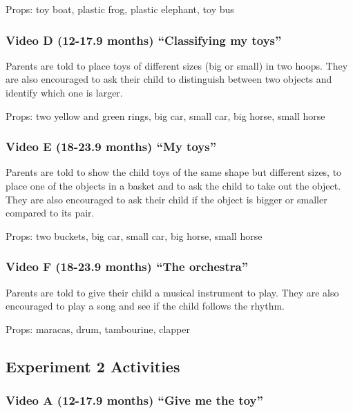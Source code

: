 \documentclass[man,floatsintext]{apa6}
\begin{document}
\begin{appendix}
Props: toy boat, plastic frog, plastic elephant, toy bus

\hypertarget{video-d-12-17.9-months-classifying-my-toys}{%
\subsubsection{Video D (12-17.9 months) ``Classifying my
toys''}\label{video-d-12-17.9-months-classifying-my-toys}}

Parents are told to place toys of different sizes (big or small) in two
hoops. They are also encouraged to ask their child to distinguish
between two objects and identify which one is larger.

Props: two yellow and green rings, big car, small car, big horse, small
horse

\hypertarget{video-e-18-23.9-months-my-toys}{%
\subsubsection{Video E (18-23.9 months) ``My
toys''}\label{video-e-18-23.9-months-my-toys}}

Parents are told to show the child toys of the same shape but different
sizes, to place one of the objects in a basket and to ask the child to
take out the object. They are also encouraged to ask their child if the
object is bigger or smaller compared to its pair.

Props: two buckets, big car, small car, big horse, small horse

\hypertarget{video-f-18-23.9-months-the-orchestra}{%
\subsubsection{Video F (18-23.9 months) ``The
orchestra''}\label{video-f-18-23.9-months-the-orchestra}}

Parents are told to give their child a musical instrument to play. They
are also encouraged to play a song and see if the child follows the
rhythm.

Props: maracas, drum, tambourine, clapper

\hypertarget{experiment-2-activities}{%
\subsection{Experiment 2 Activities}\label{experiment-2-activities}}

\hypertarget{video-a-12-17.9-months-give-me-the-toy}{%
\subsubsection{Video A (12-17.9 months) ``Give me the
toy''}\label{video-a-12-17.9-months-give-me-the-toy}}


\end{appendix}
\end{document}
